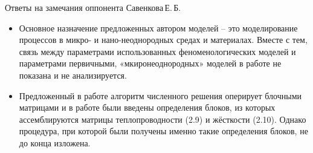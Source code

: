 \begin{frame}{Ответы на замечания оппонента Савенкова\,Е.\,Б.}
	\begin{itemize}
		\item Основное назначение предложенных автором моделей -- это моделирование процессов в микро- и нано-неоднородных средах и материалах. Вместе с тем, связь между параметрами использованных феноменологических моделей и параметрами первичными, «мкиронеоднородных» моделей в работе не показана и не анализируется.
		\item Предложенный в работе алгоритм численного решения оперирует блочными матрицами и в работе были введены определения блоков, из которых ассемблируются матрицы теплопроводности (2.9) и жёсткости (2.10). Однако процедура, при которой были получены именно такие определения блоков, не до конца изложена.
	\end{itemize}
\end{frame}
